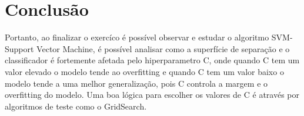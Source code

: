 \documentclass{article} %
\begin{document}
\vspace{1cm}

\section{Conclusão}

Portanto, ao finalizar o exercíco é possível observar e estudar o algoritmo SVM- Support Vector Machine, é possível analisar como a superfície de separação e o classificador é fortemente afetada pelo hiperparametro C, onde quando C tem um valor elevado o modelo tende ao overfitting e quando C tem um valor baixo o modelo tende a uma melhor generalização, pois C controla a margem e o overfitting do modelo. Uma boa lógica para escolher os valores de C é através por algoritmos de teste como o GridSearch.
\end{document}
